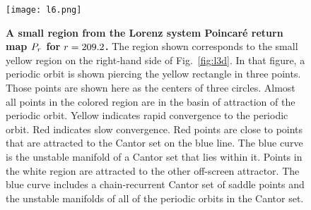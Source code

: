 \begin{figure}
 \centering
 \texttt{[image: l6.png]}
 \caption{{\bf A small region from the Lorenz system Poincar\'e return map {\BF $P_r$} for {\BF $r=209.2$}.} 
 The region shown corresponds to the small yellow region on the right-hand side of Fig.~\ref{fig:l3d}.
 In that figure, a periodic orbit is shown piercing the yellow rectangle in three points.
 Those points are shown here as the centers of three circles. 
 Almost all points in the colored region are in the basin of attraction of the periodic orbit. Yellow indicates rapid convergence to the periodic orbit. Red indicates slow convergence. Red points are close to points that are attracted to the Cantor set on the blue line.
 The blue curve is the unstable manifold of a Cantor set that lies within it.
 Points in the white region are attracted to the other off-screen attractor. 
 The blue curve includes a chain-recurrent Cantor set of saddle points and the unstable manifolds of all of the periodic orbits in the Cantor set. 
 }
 \label{fig:l2dtm}
\end{figure} 